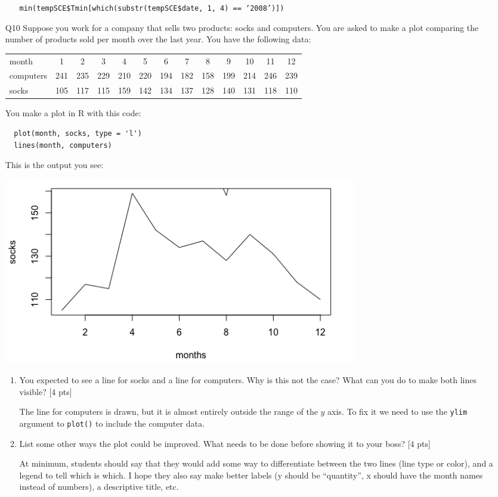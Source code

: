 \documentclass[12pt]{article}
\theoremstyle{Conjecture}
\theoremstyle{example}
\theoremstyle{remark}
\theoremstyle{lemma}
\theoremstyle{definition}
\theoremstyle{corol}
\theoremstyle{proposition}
\theoremstyle{condition}
\begin{document}
\begin{enumerate}
\begin{enumerate}
  {\color{blue}\tt min(tempSCE\$Tmin[which(substr(tempSCE\$date, 1, 4) == `2008')])}
\end{enumerate}

\newpage 
\item [Q10] Suppose you work for a company that sells two products: socks and computers. You are asked to make a plot comparing the number of products sold per month over the last year. You have the following data:

\begin{tabular}{lcccccccccccc}
month & 1 & 2 & 3 & 4 & 5 & 6 & 7 & 8 & 9 & 10 & 11 & 12 \\
computers & 241 & 235 & 229 & 210 & 220 & 194 & 182 & 158 & 199 & 214 & 246 & 239 \\
socks & 105 & 117 & 115 & 159 & 142 & 134 & 137 & 128 & 140 & 131 & 118 & 110
\end{tabular}

You make a plot in R with this code:
\vspace{-0.2in}
\begin{verbatim}
  plot(month, socks, type = 'l')
  lines(month, computers)
\end{verbatim}
\vspace{-0.2in}
This is the output you see:
\begin{center}
  \includegraphics[width=0.7\textwidth]{plot.png}
\end{center}
\begin{enumerate}
  \item You expected to see a line for socks and a line for computers. Why is this not the case? What can you do to make both lines visible? [4 pts]

  {\color{blue} The line for computers is drawn, but it is almost entirely outside the range of the $y$ axis. To fix it we need to use the \texttt{ylim} argument to \texttt{plot()} to include the computer data.}
  \item List some other ways the plot could be improved. What needs to be done before showing it to your boss? [4 pts]

  {\color{blue} At minimum, students should say that they would add some way to differentiate between the two lines (line type or color), and a legend to tell which is which. I hope they also say make better labels (y should be ``quantity'', x should have the month names instead of numbers), a descriptive title, etc.}
\end{enumerate}

\end{enumerate}
\end{document}
